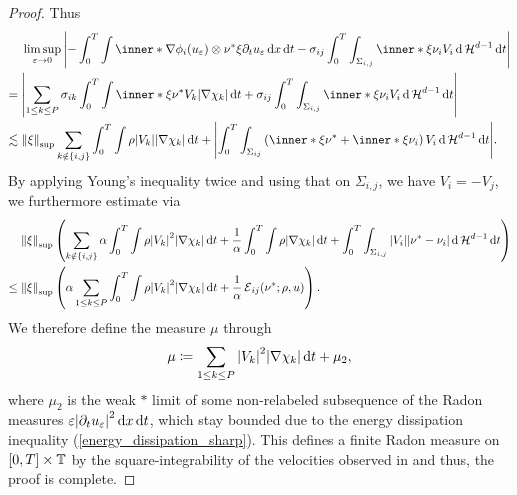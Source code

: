 \begin{proof}
	Thus
	\begin{align*}
		& \limsup_{ \varepsilon \to 0 }
			\abs{
				- \int_{ 0 }^{ T }
					\int
						\inner*{ \nabla \phi_{ i } ( u_{ \varepsilon } ) 
						\otimes \nu^{ \ast } \xi }{ \partial_{ t } u_{ 
						\varepsilon } }
					\dd{ x }
				\dd{ t }
				-
				\sigma_{ i j }
				\int_{ 0 }^{ T }
					\int_{ \Sigma_{ i , j } }
						\inner*{ \xi }{ \nu_{ i } }
						V_{ i } 	
					\dd{ \hm^{ d - 1 } }
				\dd{ t }
			}
		\\
		={} &
		\abs{
			\sum_{ 1 \leq k \leq P }
				\sigma_{ i k }
				\int_{ 0 }^{ T }
					\int
						\inner*{ \xi }{ \nu^{ \ast } }
						V_{ k }
					\abs{ \nabla \chi_{ k } }
				\dd{ t }
			+
			\sigma_{ i j }
			\int_{ 0 }^{ T }
				\int_{ \Sigma_{ i , j } }
					\inner*{ \xi }{ \nu_{ i } }
					V_{ i }
				\dd{ \hm^{ d - 1 } }
			\dd{ t }
		}
		\\
		\lesssim{} &
		\norm{ \xi }_{ \mathrm{sup} }
		\sum_{ k \notin \{ i , j \} }
			\int_{ 0 }^{ T }
				\int
					\rho
					\abs{ V_{ k } }
				\abs{ \nabla \chi_{ k } }
			\dd{ t }
		+
		\abs{
			\int_{ 0 }^{ T }
				\int_{ \Sigma_{ i j } }
					\left(
						\inner*{ \xi }{ \nu^{ \ast } }
						+
						\inner*{ \xi }{ \nu_{ i } }
					\right)
					V_{ i }
				\dd{ \hm^{ d -1 } }
			\dd{ t }
		}.
	\end{align*}
	By applying Young's inequality twice and using that on $ \Sigma_{ i , j } 
	$, we have $ V_{ 
	i } = - V_{ j } $, we furthermore estimate via
	\begin{align*}
		& \norm{ \xi }_{ \mathrm{sup} }
		\left(
			\sum_{ k \notin \{ i , j \} }
				\alpha 
				\int_{ 0 }^{ T }
					\int
						\rho
						\abs{ V_{ k } }^{ 2 }
					\abs{ \nabla \chi_{ k } }
				\dd{ t }
				+
				\frac{ 1 }{ \alpha }
				\int_{ 0 }^{ T }
					\int
						\rho
					\abs{ \nabla \chi_{ k } }
				\dd{ t }
			+
			\int_{ 0 }^{ T }
				\int_{ \Sigma_{ i , j } }
					\abs{ V_{ i } }
					\abs{ \nu^{ \ast } - \nu_{ i } }
				\dd{ \hm^{ d - 1 } }
			\dd{ t }
		\right)
		\\
		\leq{} &
		\norm{ \xi }_{\mathrm{sup} }
		\left(
			\alpha
			\sum_{ 1 \leq k \leq P }
				\int_{ 0 }^{ T }
					\int
						\rho
						\abs{ V_{ k } }^{ 2 }
					\abs{ \nabla \chi_{ k } }
				\dd{ t}
			+
			\frac{ 1 }{ \alpha }
			\tilt_excess_{ i j } ( \nu^{ \ast } ; \rho , u )
		\right).
	\end{align*}
	We therefore define the measure $ \mu $ through
	\begin{equation*}
		\mu
		\coloneqq
		\sum_{ 1 \leq k \leq P }
			\abs{ V_{ k } }^{ 2 }
			\abs{ \nabla \chi_{ k } }
			\dd{ t }
		+
		\mu_{ 2 },
	\end{equation*}
	where $ \mu_{ 2 } $ is the weak $ \ast $ limit of some non-relabeled 
	subsequence of the Radon measures $ \varepsilon \abs{ \partial_{ t } u_{ 
	\varepsilon } }^{ 2 } \dd{ x } \dd{ t } $, which stay bounded due to the 
	energy dissipation inequality (\ref{energy_dissipation_sharp}).
	This defines a finite Radon measure on $ [ 0 , T ] \times \operatorname{\mathbb{T}} $ by 
	the square-integrability of the velocities observed in 
	 and 
	thus, the proof is complete.
\end{proof}

